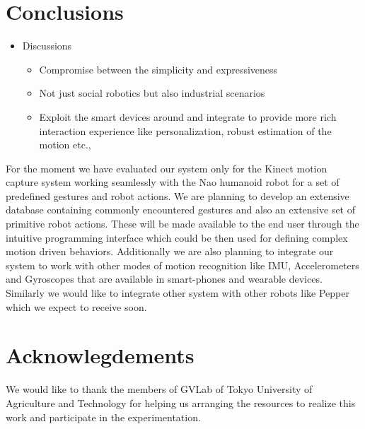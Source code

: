 \documentclass{llncs}
\begin{document}
\section{Conclusions}
%
\begin{itemize}
\item Discussions
\begin{itemize}
\item Compromise between the simplicity and expressiveness
\item Not just social robotics but also industrial scenarios
\item Exploit the smart devices around and integrate to provide more rich interaction experience like personalization, robust estimation of the motion etc., 
\end{itemize}
\end{itemize}
For the moment we have evaluated our system only for the Kinect motion capture system working seamlessly with the Nao humanoid robot for a set of predefined gestures and robot actions. We are planning to develop an extensive database containing commonly encountered gestures and also an extensive set of primitive robot actions. These will be made available to the end user through the intuitive programming interface which could be then used for defining complex motion driven behaviors. Additionally we are also planning to integrate our system to work with other modes of motion recognition like IMU, Accelerometers and Gyroscopes that are available in smart-phones and wearable devices. Similarly we would like to integrate other system with other robots like Pepper which we expect to receive soon.
%
\section{Acknowlegdements}
%
		We would like to thank the members of GVLab of Tokyo University of Agriculture and Technology for helping us arranging the resources to realize this work and participate in the experimentation.
%
%
%


\end{document}
